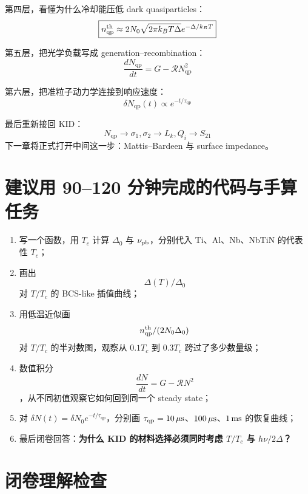 \documentclass[11pt,a4paper,openany]{ctexrep}
\newcommand{\qp}{\mathrm{qp}}
\begin{document}
第四层，看懂为什么冷却能压低 dark quasiparticles：
\[
\boxed{
n_{\qp}^{\rm th}
\approx
2N_0\sqrt{2\pi k_BT\Delta}
e^{-\Delta/k_BT}
}
\]

第五层，把光学负载写成 generation--recombination：
\[
\boxed{
\frac{dN_{\qp}}{dt}
=
G-\mathcal{R}N_{\qp}^2
}
\]

第六层，把准粒子动力学连接到响应速度：
\[
\boxed{
\delta N_{\qp}(t)\propto e^{-t/\tau_{\qp}}
}
\]

最后重新接回 KID：
\[
\boxed{
N_{\qp}
\rightarrow
\sigma_1,\sigma_2
\rightarrow
L_k,Q_i
\rightarrow
S_{21}
}
\]
下一章将正式打开中间这一步：Mattis--Bardeen 与 surface impedance。

\section{建议用 90--120 分钟完成的代码与手算任务}

\begin{enumerate}
  \item 写一个函数，用 $T_c$ 计算 $\Delta_0$ 与 $\nu_{\rm pb}$，分别代入 Ti、Al、Nb、NbTiN 的代表性 $T_c$；
  \item 画出
  \[
  \Delta(T)/\Delta_0
  \]
  对 $T/T_c$ 的 BCS-like 插值曲线；
  \item 用低温近似画
  \[
  n_{\qp}^{\rm th}/(2N_0\Delta_0)
  \]
  对 $T/T_c$ 的半对数图，观察从 $0.1T_c$ 到 $0.3T_c$ 跨过了多少数量级；
  \item 数值积分
  \[
  \frac{dN}{dt}=G-\mathcal{R}N^2
  \]
  ，从不同初值观察它如何回到同一个 steady state；
  \item 对 $\delta N(t)=\delta N_0e^{-t/\tau_{\qp}}$，分别画 $\tau_{\qp}=10\,\mu{\rm s}$、$100\,\mu{\rm s}$、$1\,{\rm ms}$ 的恢复曲线；
  \item 最后闭卷回答：\textbf{为什么 KID 的材料选择必须同时考虑 $T/T_c$ 与 $h\nu/2\Delta$？}
\end{enumerate}

\section{闭卷理解检查}
\end{document}
